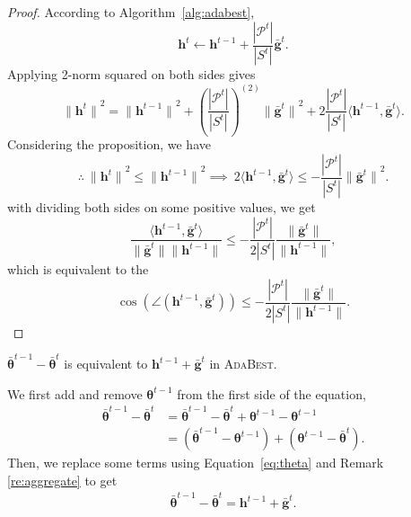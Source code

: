 \documentclass[runningheads]{llncs}
\def\eqref#1{Equation~\ref{#1}}
\def\algref#1{Algorithm~\ref{#1}}
\def\vtheta{{\bm{\theta}}}
\def\vg{{\bm{g}}}
\def\vh{{\bm{h}}}
\def\gP{{\mathcal{P}}}
\newcommand*\mean[1]{\bar{#1}}
\newcommand{\ours}{\textsc{AdaBest}\xspace}
\begin{document}
\begin{proof}
According to \algref{alg:adabest},
\begin{equation*}
 \vh^t \leftarrow \vh^{t-1} + \frac{|\gP^t|}{|S^t|} \mean{\vg}^t. 
\end{equation*}
Applying 2-norm squared on both sides gives
\begin{equation*}
{\|\vh^{t}\|}^2 = {\|\vh^{t-1}\|}^2 + \left(\frac{|\gP^t|}{|S^t|}\right)^{(2)}{\|\mean{\vg}^{t}\|}^2 + 2 \frac{|\gP^t|}{|S^t|} \langle \vh^{t-1}, \mean{\vg}^{t} \rangle.
\end{equation*}
Considering the proposition, we have
\begin{equation*}
    \therefore \ {\|\vh^t\|}^2 \leq {\|\vh^{t-1}\|}^2 \implies \ 2 \langle \vh^{t-1}, \mean{\vg}^{t} \rangle \leq - \frac{|\gP^t|}{|S^t|} {\|\mean{\vg}^{t}\|}^2.
\end{equation*}
with dividing both sides on some positive values, we get
\begin{equation*}
 \frac{\langle \vh^{t-1}, \mean{\vg}^{t} \rangle}{\|\mean{\vg}^{t}\|\|{\vh}^{t-1}\|} \leq - \frac{|\gP^t|}{2|S^t|} \frac{\|\mean{\vg}^{t}\|}{\|{\vh}^{t-1}\|},
\end{equation*}
which is equivalent to the 
\begin{equation*}
\cos( \angle (\vh^{t-1}, \mean{\vg}^{t})) \leq - \frac{|\gP^t|}{2|S^t|} \frac{\|\mean{\vg}^{t}\|}{\|{\vh}^{t-1}\|}.
\end{equation*}


\end{proof}


\vspace{0.6cm}
\begin{remark}
$\mean{\vtheta}^{t-1}-\mean{\vtheta}^{t}$ is equivalent to $\vh^{t-1} + \mean{\vg}^{t}$ in \ours.
\end{remark}
We first add and remove $\vtheta^{t-1}$ from the first side of the equation,
\begin{equation*}
\begin{split}
 \mean{\vtheta}^{t-1}-\mean{\vtheta}^{t} & = \mean{\vtheta}^{t-1}-\mean{\vtheta}^{t} + \vtheta^{t-1} - \vtheta^{t-1}\\ & = (\mean{\vtheta}^{t-1} - \vtheta^{t-1}) + (\vtheta^{t-1} - \mean{\vtheta}^{t} ).
 \end{split}
\end{equation*}
Then, we replace some terms using \eqref{eq:theta} and Remark \ref{re:aggregate} to get
\begin{equation*}
\begin{split}
 \mean{\vtheta}^{t-1}-\mean{\vtheta}^{t} =
 \vh^{t-1} + \mean{\vg}^{t}.
 \end{split}
\end{equation*}
\end{document}
